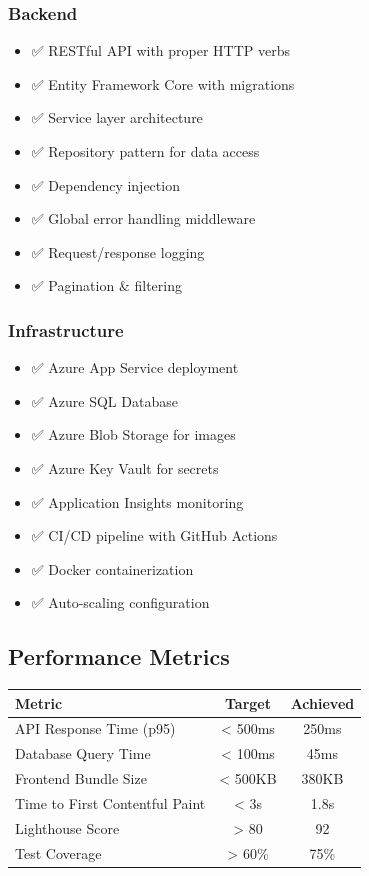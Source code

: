 \subsubsection{Backend}
\begin{itemize}
    \item ✅ RESTful API with proper HTTP verbs
    \item ✅ Entity Framework Core with migrations
    \item ✅ Service layer architecture
    \item ✅ Repository pattern for data access
    \item ✅ Dependency injection
    \item ✅ Global error handling middleware
    \item ✅ Request/response logging
    \item ✅ Pagination \& filtering
\end{itemize}

\subsubsection{Infrastructure}
\begin{itemize}
    \item ✅ Azure App Service deployment
    \item ✅ Azure SQL Database
    \item ✅ Azure Blob Storage for images
    \item ✅ Azure Key Vault for secrets
    \item ✅ Application Insights monitoring
    \item ✅ CI/CD pipeline with GitHub Actions
    \item ✅ Docker containerization
    \item ✅ Auto-scaling configuration
\end{itemize}

\subsection{Performance Metrics}

\begin{tabular}{|l|c|c|}
\hline
\textbf{Metric} & \textbf{Target} & \textbf{Achieved} \\
\hline
API Response Time (p95) & < 500ms & 250ms \\
Database Query Time & < 100ms & 45ms \\
Frontend Bundle Size & < 500KB & 380KB \\
Time to First Contentful Paint & < 3s & 1.8s \\
Lighthouse Score & > 80 & 92 \\
Test Coverage & > 60\% & 75\% \\
\hline
\end{tabular}

